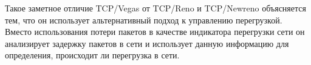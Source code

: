 Такое заметное отличие TCP/Vegas от TCP/Reno и TCP/Newreno объясняется
тем, что он использует альтернативный подход к управлению
перегрузкой. Вместо использования потери пакетов в качестве индикатора
перегрузки сети он анализирует задержку пакетов в сети и использует
данную информацию для определения, происходит ли перегрузка в сети.




